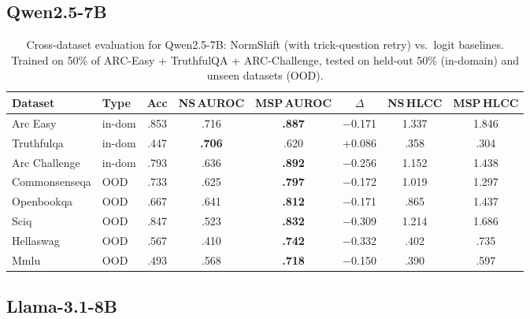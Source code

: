 \documentclass[11pt,a4paper]{article}
\begin{document}
\subsection{Qwen2.5-7B}

\begin{table}[H]
\centering
\caption{Cross-dataset evaluation for Qwen2.5-7B: NormShift (with trick-question retry) vs.\ logit baselines.
         Trained on 50\% of ARC-Easy + TruthfulQA + ARC-Challenge,
         tested on held-out 50\% (in-domain) and unseen datasets (OOD).}
\label{tab:cross-dataset-qwen25-7b}
\small
\begin{tabular}{@{}llcccccc@{}}
\toprule
Dataset & Type & Acc & NS\,AUROC & MSP\,AUROC & $\Delta$ & NS\,HLCC & MSP\,HLCC \\
\midrule
Arc Easy             & in-dom & .853 & .716 & \textbf{.887} & $-$0.171 & 1.337 & 1.846 \\
Truthfulqa           & in-dom & .447 & \textbf{.706} & .620 & $+$0.086 & .358 & .304 \\
Arc Challenge        & in-dom & .793 & .636 & \textbf{.892} & $-$0.256 & 1.152 & 1.438 \\
Commonsenseqa        & OOD & .733 & .625 & \textbf{.797} & $-$0.172 & 1.019 & 1.297 \\
Openbookqa           & OOD & .667 & .641 & \textbf{.812} & $-$0.171 & .865 & 1.437 \\
Sciq                 & OOD & .847 & .523 & \textbf{.832} & $-$0.309 & 1.214 & 1.686 \\
Hellaswag            & OOD & .567 & .410 & \textbf{.742} & $-$0.332 & .402 & .735 \\
Mmlu                 & OOD & .493 & .568 & \textbf{.718} & $-$0.150 & .390 & .597 \\
\bottomrule
\end{tabular}
\end{table}

\subsection{Llama-3.1-8B}
\end{document}
